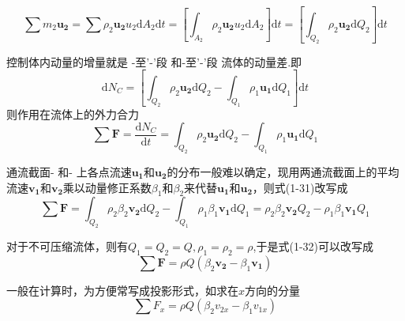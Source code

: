 \begin{equation*}
  \sum{m_2\boldsymbol{u_2}}=\sum\rho_2\boldsymbol{u_2}u_2\mathrm{d}A_2\mathrm{d}t=[\int_{A_2}\rho_2\boldsymbol{u_2}u_2\mathrm{d}A_2]\mathrm{d}t=[\int_{Q_2}\rho_2\boldsymbol{u_2}\mathrm{d}Q_2]\mathrm{d}t
\end{equation*}

控制体内动量的增量就是
\uppercase\expandafter{}-\uppercase\expandafter{}至\uppercase\expandafter{}'-\uppercase\expandafter{}'段
和\uppercase\expandafter{}-\uppercase\expandafter{}至\uppercase\expandafter{}'-\uppercase\expandafter{}'段
流体的动量差.即
\begin{equation*}
  \mathrm{d}N_C=[\int_{Q_2}\rho_2\boldsymbol{u_2}\mathrm{d}Q_2-\int_{Q_1}\rho_1\boldsymbol{u_1}\mathrm{d}Q_1]\mathrm{d}t
\end{equation*} 
则作用在流体上的外力合力
\begin{equation}
\sum \boldsymbol F=\frac{\mathrm{d}N_C}{\mathrm{d}t}=\int_{Q_2}\rho_2\boldsymbol{u_2}\mathrm{d}Q_2-\int_{Q_1}\rho_1\boldsymbol{u_1}\mathrm{d}Q_1
\end{equation} 

通流截面\uppercase\expandafter{}-\uppercase\expandafter{}
和\uppercase\expandafter{}-\uppercase\expandafter{}
上各点流速$\boldsymbol{u_1}$和$\boldsymbol{u_2}$的分布一般难以确定，现用两通流截面上的平均流速$\boldsymbol{v_1}$和$\boldsymbol{v_2}$乘以动量修正系数$\beta_1$和$\beta_2$来代替$\boldsymbol{u_1}$和$\boldsymbol{u_2}$，则式(1-31)改写成
\begin{equation}
  \sum \boldsymbol F=\int_{Q_2}\rho_2\beta_2\boldsymbol{v_2}\mathrm{d}Q_2-\int_{Q_1}\rho_1\beta_1\boldsymbol{v_1}\mathrm{d}Q_1=\rho_2\beta_2\boldsymbol{v_2}Q_2-\rho_1\beta_1\boldsymbol{v_1}Q_1
  \end{equation} 

对于不可压缩流体，则有$Q_1=Q_2=Q,\rho_1=\rho_2=\rho$,于是式(1-32)可以改写成
\begin{equation}
  \sum \boldsymbol F=\rho Q(\beta_2\boldsymbol{v_2}-\beta_1\boldsymbol{v_1})
  \end{equation} 

  一般在计算时，为方便常写成投影形式，如求在$x$方向的分量
  \begin{equation}
    \sum F_x=\rho Q(\beta_2 v_{2x}-\beta_1 v_{1x})
    \end{equation} 

